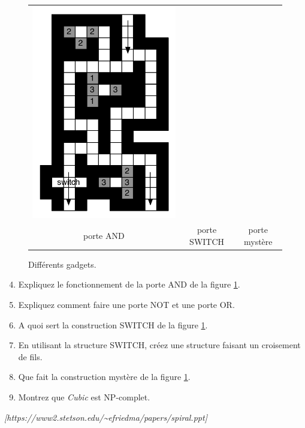 \documentclass[12pt]{article}
\newcommand{\source}[1]{\begin{flushright}\emph{[#1]}\end{flushright}}
\begin{document}
\begin{figure}[h]
\begin{center}
\begin{tabular}{c c c}
    \includegraphics[scale=0.58]{./figures/porteMYSTERE}\\
 porte AND &
 porte SWITCH &
 porte mystère
 \end{tabular}
\end{center}
 \caption{Différents gadgets.}
 \label{gadgets}
\end{figure}

\begin{enumerate}
	\setcounter{enumi}{3}
	\item Expliquez le fonctionnement de la porte AND de la figure \ref{gadgets}.
	\item Expliquez comment faire une porte NOT et une porte OR.
	\item A quoi sert la construction SWITCH de la figure \ref{gadgets}.
	\item En utilisant la structure SWITCH, créez une structure faisant un croisement de fils.
	\item Que fait la construction mystère de la figure \ref{gadgets}.
	\item Montrez que \textit{Cubic} est NP-complet.
\end{enumerate}

\source{https://www2.stetson.edu/\~{}efriedma/papers/spiral.ppt}
\end{document}
